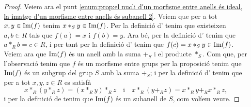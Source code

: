 \documentclass[../Apunts.tex]{subfiles}
\begin{document}
\begin{proposition}
\begin{proof}
			Veiem ara el punt \eqref{enum:prop:el nucli d'un morfisme entre anells és ideal, la imatge d'un morfisme entre anells és subanell 2}. Veiem que per a tot \(x,y\in\operatorname*{Im}(f)\) tenim \(x\ast_{S}y\in\operatorname*{Im}(f)\). Per la definició d' tenim que existeixen \(a,b\in R\) tals que \(f(a)=x\) i \(f(b)=y\). Ara bé, per la definició d' tenim que \(a\ast_{R}b=c\in R\), i per tant per la definició d' tenim que \(f(c)=x\ast_{S}y\in\operatorname*{Im}(f)\). Veiem ara que \(\operatorname*{Im}(f)\) és un anell amb la suma \(+_{S}\) i el producte \(\ast_{S}\). Com que, per l'observació  tenim que \(f\) és un morfisme entre grups per la proposició  tenim que \(\operatorname*{Im}(f)\) és un subgrup del grup \(S\) amb la suma \(+_{S}\); i per la definició d' tenim que per a tot \(x,y,z\in R\) es satisfà
			\[x\ast_{R}(y\ast_{R}z)=(x\ast_{R}y)\ast_{R}z\quad\text{i}\quad x\ast_{R}(y+_{R}z)=x\ast_{R}y+_{R}x\ast_{R}z,\]
			i per la definició de  tenim que \(\operatorname*{Im}(f)\) és un subanell de \(S\), com volíem veure.
		\end{proof}
	\end{proposition}
\end{document}
